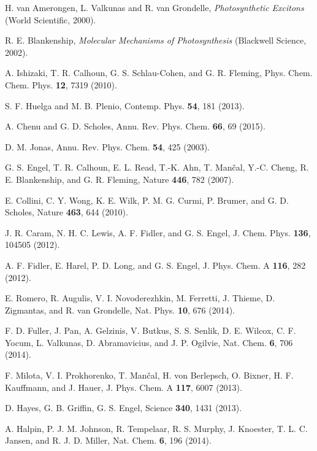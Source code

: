 \documentclass[%
 reprint,%
 amssymb, amsmath,%
 aip,cha,%
]{revtex4-1}
\begin{document}
\begin{thebibliography}{99}

 H. van Amerongen, L. Valkunas and R. van Grondelle, {\it Photosynthetic Excitons} (World Scientific, 2000).

 R. E. Blankenship, {\it Molecular Mechanisms of Photosynthesis} (Blackwell Science, 2002).

 A. Ishizaki, T. R. Calhoun, G. S. Schlau-Cohen, and G. R. Fleming, Phys. Chem. Chem. Phys. {\bf 12}, 7319 (2010).

 S. F. Huelga and M. B. Plenio, Contemp. Phys. {\bf 54}, 181 (2013).

 A. Chenu and G. D. Scholes, Annu. Rev. Phys. Chem. {\bf 66}, 69 (2015).

 D. M. Jonas, Annu. Rev. Phys. Chem. {\bf 54}, 425 (2003).

 G. S. Engel, T. R. Calhoun, E. L. Read, T.-K. Ahn, T. Man{\v c}al, Y.-C. Cheng, R. E. Blankenship, and G. R. Fleming, Nature {\bf 446}, 782 (2007).

 E. Collini, C. Y. Wong, K. E. Wilk, P. M. G. Curmi, P. Brumer, and G. D. Scholes, Nature {\bf 463}, 644 (2010).

 J. R. Caram, N. H. C. Lewis, A. F. Fidler, and G. S. Engel, J. Chem. Phys. {\bf 136}, 104505 (2012).

 A. F. Fidler, E. Harel, P. D. Long, and G. S. Engel, J. Phys. Chem. A {\bf 116}, 282 (2012).

 E. Romero, R. Augulis, V. I. Novoderezhkin, M. Ferretti, J. Thieme, D. Zigmantas, and R. van Grondelle, Nat. Phys. {\bf 10}, 676 (2014).

 F. D. Fuller, J. Pan, A. Gelzinis, V. Butkus, S. S. Senlik, D. E. Wilcox, C. F. Yocum, L. Valkunas, D. Abramavicius, and J. P. Ogilvie, Nat. Chem. {\bf 6}, 706 (2014).

 F. Milota, V. I. Prokhorenko, T. Man{\v c}al, H. von Berlepsch, O. Bixner, H. F. Kauffmann, and J. Hauer, J. Phys. Chem. A {\bf 117}, 6007 (2013).

 D. Hayes, G. B. Griffin, G. S. Engel, Science {\bf 340}, 1431 (2013).

 A. Halpin, P. J. M. Johnson, R. Tempelaar, R. S. Murphy, J. Knoester, T. L. C. Jansen, and R. J. D. Miller, Nat. Chem. {\bf 6}, 196 (2014).


\end{thebibliography}
\end{document}
